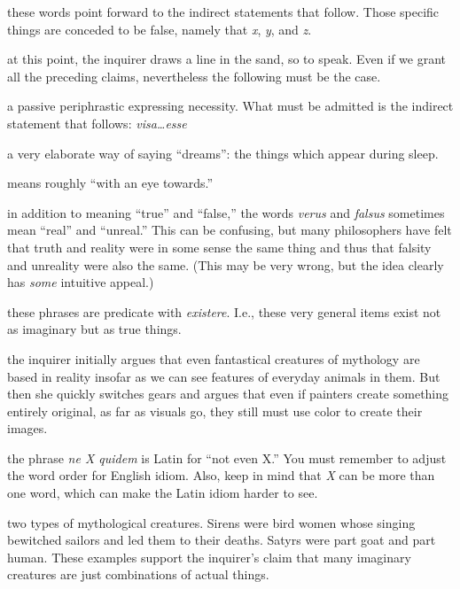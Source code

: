  these words point forward to the indirect statements that follow. Those specific things are conceded to be false, namely that \textit{x}, \textit{y}, and \textit{z}.

 at this point, the inquirer draws a line in the sand, so to speak. Even if we grant all the preceding claims, nevertheless the following must be the case.

 a passive periphrastic expressing necessity. What must be admitted is the indirect statement that follows: \textit{visa\dots esse}

 a very elaborate way of saying ``dreams'': the things which appear during sleep.

 means roughly ``with an eye towards.''

 in addition to meaning ``true'' and ``false,'' the words \textit{verus} and \textit{falsus} sometimes mean ``real'' and ``unreal.'' This can be confusing, but many philosophers have felt that truth and reality were in some sense the same thing and thus that falsity and unreality were also the same. (This may be very wrong, but the idea clearly has \textit{some} intuitive appeal.)

 these phrases are predicate with \textit{existere}. I.e., these very general items exist not as imaginary but as true things.

 the inquirer initially argues that even fantastical creatures of mythology are based in reality insofar as we can see features of everyday animals in them. But then she quickly switches gears and argues that even if painters create something entirely original, as far as visuals go, they still must use color to create their images.

 the phrase \textit{ne X quidem} is Latin for ``not even X.'' You must remember to adjust the word order for English idiom. Also, keep in mind that \textit{X} can be more than one word, which can make the Latin idiom harder to see.

 two types of mythological creatures. Sirens were bird women whose singing bewitched sailors and led them to their deaths. Satyrs were part goat and part human. These examples support the inquirer's claim that many imaginary creatures are just combinations of actual things.


